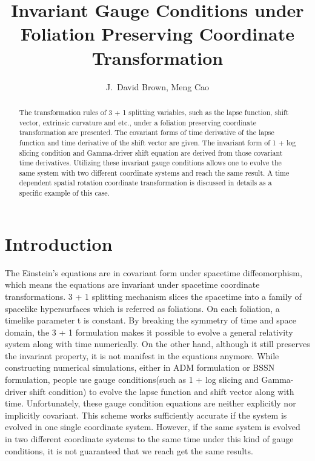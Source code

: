 \documentclass[letterpaper,nofootinbib,prd,amsmath,onecolumn]{revtex4-1}
\begin{document}

\title{Invariant Gauge Conditions under Foliation Preserving Coordinate Transformation}
\author{J.~David Brown, Meng Cao}

\begin{abstract}
The transformation rules of 3 + 1 splitting variables, such as the lapse function, shift vector, extrinsic curvature and etc., under a foliation preserving coordinate transformation are presented. The covariant forms of time derivative of the lapse function and time derivative of the shift vector are given. The invariant form of 1 + log slicing condition and Gamma-driver shift equation are derived from those covariant time derivatives. Utilizing these invariant gauge conditions allows one to evolve the same system with two different coordinate systems and reach the same result. A time dependent spatial rotation coordinate transformation is discussed in details as a specific example of this case.  
\end{abstract}
\maketitle

\section{Introduction}
The Einstein's equations are in covariant form under spacetime diffeomorphism, which means the equations are invariant under spacetime coordinate transformations. 3 + 1 splitting mechanism slices the spacetime into a family of spacelike hypersurfaces which is referred as foliations. On each foliation, a timelike parameter t is constant. By breaking the symmetry of time and space domain, the 3 + 1 formulation makes it possible to evolve a general relativity system along with time numerically. On the other hand, although it still preserves the invariant property, it is not manifest in the equations anymore. While constructing numerical simulations, either in ADM formulation or BSSN formulation, people use gauge conditions(such as 1 + log slicing and Gamma-driver shift condition) to evolve the lapse function and shift vector along with time. Unfortunately, these gauge condition equations are neither explicitly nor implicitly covariant. This scheme works sufficiently accurate if the system is evolved in one single coordinate system. However, if the same system is evolved in two different coordinate systems to the same time under this kind of gauge conditions, it is not guaranteed that we reach get the same results. 
\end{document}
